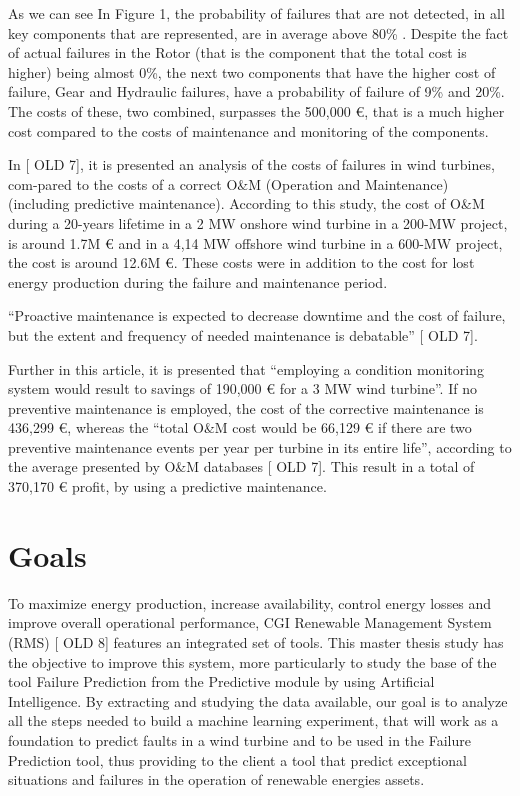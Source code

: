 As we can see In Figure 1, the probability of failures that are not detected, in all key components that are represented, are in average above 80\% . Despite the fact of actual failures in the Rotor (that is the component that the total cost is higher) being almost 0\%, the next two components that have the higher cost of failure, Gear and Hydraulic failures, have a probability of failure of 9\%  and 20\%. The costs of these, two combined, surpasses the 500,000 €, that is a much higher cost compared to the costs of maintenance and monitoring of the components.


In [ OLD 7], it is presented an analysis of the costs of failures in wind turbines, com-pared to the costs of a correct O&M (Operation and Maintenance) (including predictive maintenance). According to this study, the cost of O\&M during a 20-years lifetime in a 2 MW onshore wind turbine in a 200-MW project, is around 1.7M € and in a 4,14 MW offshore wind turbine in a 600-MW project, the cost is around 12.6M €. These costs were in addition to the cost for lost energy production during the failure and maintenance period.

“Proactive maintenance is expected to decrease downtime and the cost of failure, but the extent and frequency of needed maintenance is debatable” [ OLD 7].

Further in this article, it is presented that “employing a condition monitoring system would result to savings of 190,000 € for a 3 MW wind turbine”. If no preventive maintenance is employed, the cost of the corrective maintenance is 436,299 €, whereas the “total O\&M cost would be 66,129 € if there are two preventive maintenance events per year per turbine in its entire life”, according to the average presented by O&M databases [ OLD 7]. This result in a total of 370,170 € profit, by using a predictive maintenance.

\section{Goals} 
\label{sub:if_you_use_this_template} 

To maximize energy production, increase availability, control energy losses and improve overall operational performance, CGI Renewable Management System (RMS) [ OLD 8] features an integrated set of tools. This master thesis study has the objective to improve this system, more particularly to study the base of the tool Failure Prediction from the Predictive module by using Artificial Intelligence. By extracting and studying the data available, our goal is to analyze all the steps needed to build a machine learning experiment, that will work as a foundation to predict faults in a wind turbine and to be used in the Failure Prediction tool, thus providing to the client a tool that predict exceptional situations and failures in the operation of renewable energies assets.

